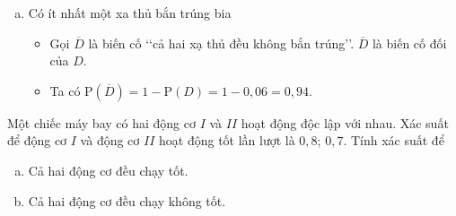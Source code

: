 \begin{bt}
{\begin{enumerate}[a)]
\begin{itemize}
            \end{itemize}
        \item Có ít nhất một xa thủ bắn trúng bia
            \begin{itemize} 
                \item Gọi $\overline{D}$ là biến cố \lq\lq cả hai xạ thủ đều không bắn trúng\rq\rq. $\overline{D}$ là biến cố đối của $D$.
                \item Ta có $\mathrm{P}(\overline{D})=1-\mathrm{P}(D)=1-0{,}06=0{,}94$.
            \end{itemize}
    \end{enumerate}
}
\end{bt}

\begin{bt}%
    Một chiếc máy bay có hai động cơ $I$ và $II$ hoạt động độc lập với nhau. Xác suất để động cơ $I$ và  động cơ $II$ hoạt động tốt lần lượt là $0{,}8$; $0{,}7$. Tính xác suất để
\begin{enumerate}[a)]
    \item   Cả hai động cơ đều chạy tốt.
    \item Cả hai động cơ đều chạy không tốt.
\end{enumerate}     
\end{bt}


